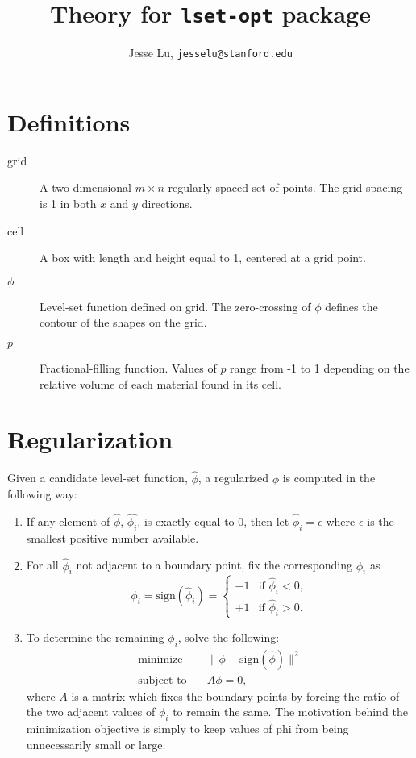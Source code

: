 \documentclass{article}
\title{Theory for \texttt{lset-opt} package}
\author{Jesse Lu, \texttt{jesselu@stanford.edu}}
\begin{document}
\maketitle
\tableofcontents

\section{Definitions}
\begin{description}
    \item[grid] A two-dimensional $m \times n$ regularly-spaced set of points. The grid spacing is 1 in both $x$ and $y$ directions.
    \item[cell] A box with length and height equal to 1, centered at a grid point.
    \item[$\phi$] Level-set function defined on grid. The zero-crossing of $\phi$ defines the contour of the shapes on the grid.
    \item[$p$] Fractional-filling function. Values of $p$ range from -1 to 1 depending on the relative volume of each material found in its cell.
\end{description}

\section{Regularization}
Given a candidate level-set function, $\hat{\phi}$, a regularized $\phi$ is computed in the following way:
\begin{enumerate}
    \item If any element of $\hat{\phi}$, $\hat{\phi_i}$, is exactly equal to 0, then let $\hat{\phi}_i = \epsilon$ where $\epsilon$ is the smallest positive number available.
    \item For all $\hat{\phi}_i$ not adjacent to a boundary point, fix the corresponding $\phi_i$ as 
    \begin{equation}
        \phi_i = \text{sign}(\hat{\phi}_i) = 
        \begin{cases}
            -1& \text{if } \hat{\phi}_i < 0, \\
            +1& \text{if } \hat{\phi}_i > 0.
        \end{cases}
    \end{equation}
    \item To determine the remaining $\phi_i$, solve the following:
    \begin{align}
        \text{minimize} \quad & \| \phi - \text{sign}(\hat{\phi})\|^2 \\
        \text{subject to} \quad & A \phi = 0,
    \end{align}
    where $A$ is a matrix which fixes the boundary points by forcing the ratio of the two adjacent values of $\phi_i$ to remain the same. The motivation behind the minimization objective is simply to keep values of phi from being unnecessarily small or large.
\end{enumerate}
\end{document}

